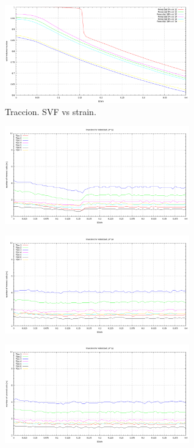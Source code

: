 \documentclass[10pt, oneside]{article} %
\begin{document}
\begin{figure}[H]
\centering
\includegraphics[width=8cm]{Figures/Porosidad_svf_strain_2vel_trac.png}
\caption{Traccion. SVF vs strain.}
\label{fg:3trac}
\end{figure}

\begin{figure}[H]
\centering
\includegraphics[width=8cm]{Figures/Porosidad_2vel_trac_voronoi1.png}
\caption{}
\label{fg:4trac}
\end{figure}

\begin{figure}[H]
\centering
\includegraphics[width=8cm]{Figures/Porosidad_2vel_trac_voronoi2.png}
\caption{}
\end{figure}

\begin{figure}[H]
\centering
\includegraphics[width=8cm]{Figures/Porosidad_2vel_trac_voronoi3.png}
\caption{}
\end{figure}
\end{document}
